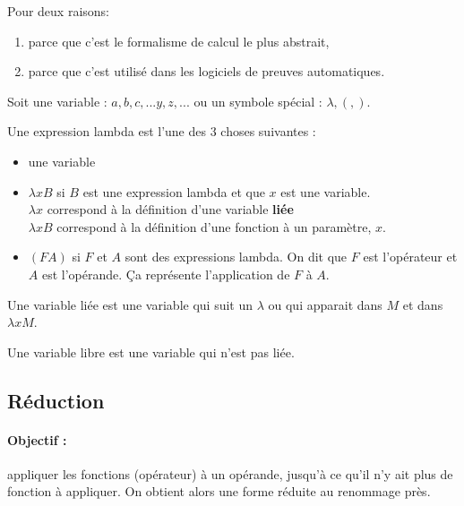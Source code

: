 \begin{myrem}
	Pour deux raisons:
	\begin{enumerate}
		\item parce que c'est le formalisme de calcul le plus abstrait,
		\item parce que c'est utilisé dans les logiciels de preuves automatiques.
	\end{enumerate}
\end{myrem}

\begin{mydef} Soit une variable : $a,b,c,...y,z,...$ ou un
	symbole spécial : $\lambda, (, )$.
\end{mydef}

\begin{mydef} Une expression lambda est l'une des 3 choses suivantes :
	\begin{itemize}
		\item une variable
		\item $\lambda xB$ si $B$ est une expression lambda et que $x$ est
			une variable. \\
			$\lambda x$ correspond à la définition
			d'une variable \textbf{liée} \\
			$\lambda xB$ correspond à la définition d'une fonction
			à un paramètre, $x$.
		\item $(FA)$ si $F$ et $A$ sont des expressions lambda. On dit que $F$
			est l'opérateur et $A$ est l'opérande. Ça représente
			l'application de $F$ à $A$.
	\end{itemize}
\end{mydef}

\begin{mydef} Une variable liée est une variable qui suit un $\lambda$ ou qui
	apparait dans $M$ et dans $\lambda xM$.
\end{mydef}

\begin{mydef} Une variable libre est une variable qui n'est pas liée.
\end{mydef}

\subsection{Réduction}

\paragraph{Objectif :} appliquer les fonctions (opérateur) à un opérande,
jusqu'à ce qu'il n'y ait plus de fonction à appliquer. On obtient alors une
forme réduite au renommage près.

